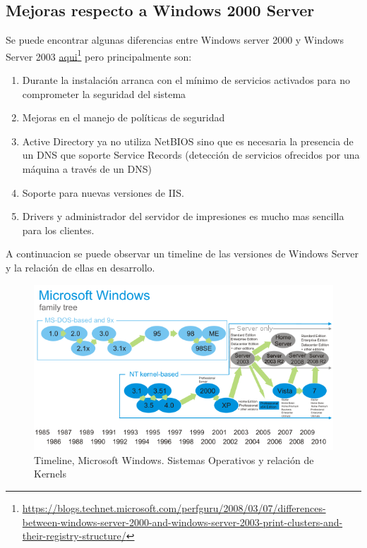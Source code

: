 \documentclass[paper=a4, fontsize=12pt]{article} 		%
\newcommand\fnurl[2]{%
\href{#2}{#1}\footnote{\url{#2}}%
}
\numberwithin{equation}{section}						%
\numberwithin{table}{section} 							%
\begin{document}
\subsection{Mejoras respecto a Windows 2000 Server}
Se puede encontrar algunas diferencias entre  Windows server 2000 y Windows Server 2003 \fnurl{aqui}{https://blogs.technet.microsoft.com/perfguru/2008/03/07/differences-between-windows-server-2000-and-windows-server-2003-print-clusters-and-their-registry-structure/} pero principalmente son:
\begin{enumerate}
\item Durante la instalación arranca con el mínimo de servicios activados para no comprometer la seguridad del sistema
\item Mejoras en el manejo de políticas de seguridad
\item Active Directory ya no utiliza NetBIOS sino que es necesaria la presencia de un DNS que soporte Service Records (detección de servicios ofrecidos por una máquina a través de un DNS)
\item Soporte para nuevas versiones de IIS.
\item Drivers y administrador del servidor de impresiones es mucho mas sencilla para los clientes.
\end{enumerate}
A continuacion se puede observar un timeline de las versiones de Windows Server y la relación de ellas en desarrollo.
\begin{center}
\begin{figure}[H]
\includegraphics[scale=0.6]{imgs/diff.png}
\caption{Timeline, Microsoft Windows. Sistemas Operativos y relación de Kernels}
\label{fig:mejora}
\end{figure}
\end{center}
\end{document}
